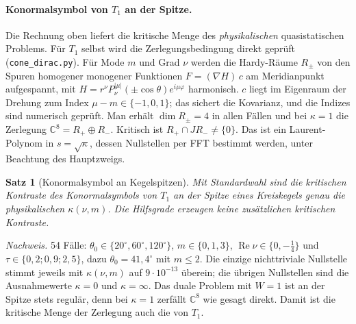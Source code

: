\documentclass[11pt, a4paper]{article}
\theoremstyle{plain}
\newtheorem{satz}{Satz}[section]
\theoremstyle{definition}
\newcommand{\status}[1]{\hfill{\small\sffamily[#1]}}
\begin{document}
\paragraph{Konormalsymbol von $T_1$ an der Spitze.} Die Rechnung oben liefert die
kritische Menge des \emph{physikalischen} quasistatischen Problems. Für $T_1$ selbst
wird die Zerlegungsbedingung direkt geprüft (\texttt{cone\_dirac.py}). Für Mode $m$ und
Grad $\nu$ werden die Hardy-Räume $R_\pm$ von den Spuren homogener monogener Funktionen
$F=(\nabla H)\,c$ am Meridianpunkt aufgespannt, mit
$H=r^\nu P_\nu^{|\mu|}(\pm\cos\theta)e^{i\mu\varphi}$ harmonisch. $c$ liegt im Eigenraum der
Drehung zum Index $\mu-m\in\{-1,0,1\}$; das sichert die Kovarianz, und die Indizes sind
numerisch geprüft. Man erhält $\dim R_\pm=4$ in allen Fällen und bei $\kappa=1$ die
Zerlegung $\mathbb{C}^8=R_+\oplus R_-$. Kritisch ist $R_+\cap JR_-\ne\{0\}$. Das ist ein
Laurent-Polynom in $s=\sqrt\kappa$, dessen Nullstellen per FFT bestimmt werden, unter
Beachtung des Hauptzweigs.

\begin{satz}[Konormalsymbol an Kegelspitzen]\label{satz:kegelT1}\status{numerisch belegt}
Mit Standardwahl sind die kritischen Kontraste des Konormalsymbols von $T_1$ an der
Spitze eines Kreiskegels genau die physikalischen $\kappa(\nu,m)$. Die Hilfsgrade
erzeugen keine zusätzlichen kritischen Kontraste.
\end{satz}
\noindent\emph{Nachweis.} 54 Fälle: $\theta_0\in\{20^\circ,60^\circ,120^\circ\}$,
$m\in\{0,1,3\}$, $\operatorname{Re}\nu\in\{0,-\tfrac14\}$ und
$\tau\in\{0{,}2;0{,}9;2{,}5\}$, dazu $\theta_0=41{,}4^\circ$ mit $m\le2$. Die einzige
nichttriviale Nullstelle stimmt jeweils mit $\kappa(\nu,m)$ auf $9\cdot10^{-13}$ überein;
die übrigen Nullstellen sind die Ausnahmewerte $\kappa=0$ und $\kappa=\infty$. Das
duale Problem mit $W=1$ ist an der Spitze stets regulär, denn bei $\kappa=1$ zerfällt
$\mathbb{C}^8$ wie gesagt direkt. Damit ist die kritische Menge der Zerlegung auch die
von $T_1$.
\end{document}
